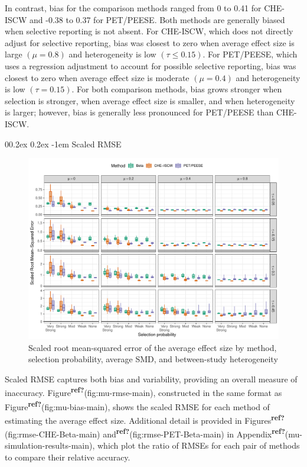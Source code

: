 \documentclass[
  american,
  man, donotrepeattitle,floatsintext]{apa7}
\makeatletter
\let\oldparagraph\paragraph
\renewcommand{\paragraph}{
    \@ifstar
      \xxxParagraphStar
      \xxxParagraphNoStar
  }
\newcommand{\xxxParagraphStar}[1]{\oldparagraph*{#1}\mbox{}}
\newcommand{\xxxParagraphNoStar}[1]{\oldparagraph{#1}\mbox{}}
\renewcommand{\paragraph}{\@startsection{paragraph}{4}{\parindent}%
  {0\baselineskip \@plus 0.2ex \@minus 0.2ex}%
  {-1em}%
  {\normalfont\normalsize\bfseries\itshape\typesectitle}}
\makeatother
\begin{document}
In contrast, bias for the comparison methods ranged from 0 to 0.41 for CHE-ISCW and -0.38 to 0.37 for PET/PEESE. Both methods are generally biased when selective reporting is not absent.
For CHE-ISCW, which does not directly adjust for selective reporting, bias was closest to zero when average effect size is large \((\mu = 0.8)\) and heterogeneity is low \((\tau \leq 0.15)\).
For PET/PEESE, which uses a regression adjustment to account for possible selective reporting, bias was closest to zero when average effect size is moderate \((\mu = 0.4)\) and heterogeneity is low \((\tau = 0.15)\).
For both comparison methods, bias grows stronger when selection is stronger, when average effect size is smaller, and when heterogeneity is larger; however, bias is generally less pronounced for PET/PEESE than CHE-ISCW.

\paragraph{Scaled RMSE}\label{scaled-rmse}

\begin{figure}
\includegraphics{beta-function-selection-models-with-dependent-effects_files/figure-latex/mu-rmse-main-1} \caption{Scaled root mean-squared error of the average effect size by method, selection probability, average SMD, and between-study heterogeneity}\label{fig:mu-rmse-main}
\end{figure}

Scaled RMSE captures both bias and variability, providing an overall measure of inaccuracy. Figure\textsuperscript{\textbf{ref?}}(fig:mu-rmse-main), constructed in the same format as Figure\textsuperscript{\textbf{ref?}}(fig:mu-bias-main), shows the scaled RMSE for each method of estimating the average effect size. Additional detail is provided in Figures\textsuperscript{\textbf{ref?}}(fig:rmse-CHE-Beta-main) and\textsuperscript{\textbf{ref?}}(fig:rmse-PET-Beta-main) in Appendix\textsuperscript{\textbf{ref?}}(mu-simulation-results-main), which plot the ratio of RMSEs for each pair of methods to compare their relative accuracy.
\end{document}
